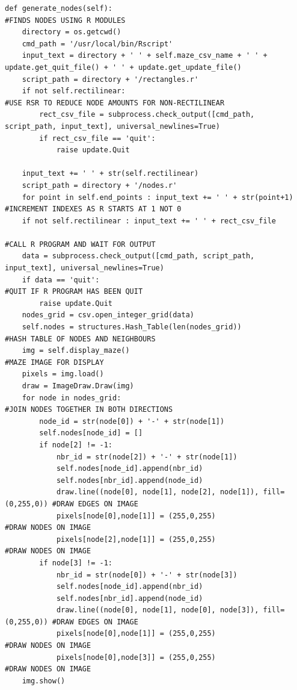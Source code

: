 \documentclass[titlepage]{article}
\begin{document}
\begin{changemargin}{-1in}{-1in} 
\begin{verbatim}
def generate_nodes(self):                                                   #FINDS NODES USING R MODULES
    directory = os.getcwd()
    cmd_path = '/usr/local/bin/Rscript'
    input_text = directory + ' ' + self.maze_csv_name + ' ' + update.get_quit_file() + ' ' + update.get_update_file()
    script_path = directory + '/rectangles.r'
    if not self.rectilinear:                                                #USE RSR TO REDUCE NODE AMOUNTS FOR NON-RECTILINEAR 
        rect_csv_file = subprocess.check_output([cmd_path, script_path, input_text], universal_newlines=True)
        if rect_csv_file == 'quit':
            raise update.Quit

    input_text += ' ' + str(self.rectilinear)
    script_path = directory + '/nodes.r'
    for point in self.end_points : input_text += ' ' + str(point+1)         #INCREMENT INDEXES AS R STARTS AT 1 NOT 0
    if not self.rectilinear : input_text += ' ' + rect_csv_file
                                                                            #CALL R PROGRAM AND WAIT FOR OUTPUT
    data = subprocess.check_output([cmd_path, script_path, input_text], universal_newlines=True)
    if data == 'quit':                                                      #QUIT IF R PROGRAM HAS BEEN QUIT
        raise update.Quit
    nodes_grid = csv.open_integer_grid(data)
    self.nodes = structures.Hash_Table(len(nodes_grid))                     #HASH TABLE OF NODES AND NEIGHBOURS
    img = self.display_maze()                                               #MAZE IMAGE FOR DISPLAY
    pixels = img.load()
    draw = ImageDraw.Draw(img)
    for node in nodes_grid:                                                 #JOIN NODES TOGETHER IN BOTH DIRECTIONS
        node_id = str(node[0]) + '-' + str(node[1])
        self.nodes[node_id] = []
        if node[2] != -1:
            nbr_id = str(node[2]) + '-' + str(node[1])
            self.nodes[node_id].append(nbr_id)
            self.nodes[nbr_id].append(node_id)
            draw.line((node[0], node[1], node[2], node[1]), fill=(0,255,0)) #DRAW EDGES ON IMAGE
            pixels[node[0],node[1]] = (255,0,255)                           #DRAW NODES ON IMAGE
            pixels[node[2],node[1]] = (255,0,255)                           #DRAW NODES ON IMAGE
        if node[3] != -1:
            nbr_id = str(node[0]) + '-' + str(node[3])
            self.nodes[node_id].append(nbr_id)
            self.nodes[nbr_id].append(node_id)
            draw.line((node[0], node[1], node[0], node[3]), fill=(0,255,0)) #DRAW EDGES ON IMAGE
            pixels[node[0],node[1]] = (255,0,255)                           #DRAW NODES ON IMAGE
            pixels[node[0],node[3]] = (255,0,255)                           #DRAW NODES ON IMAGE
    img.show()
\end{verbatim}
\end{changemargin} 
\end{document}
